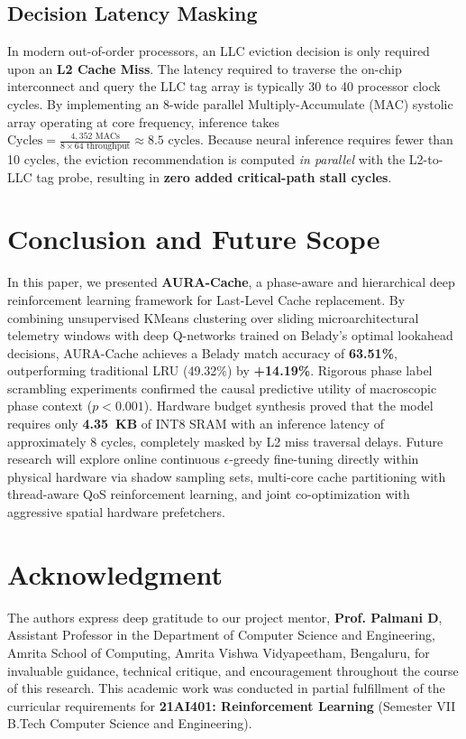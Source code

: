 \documentclass[conference]{IEEEtran}
\begin{document}
\subsection{Decision Latency Masking}
In modern out-of-order processors, an LLC eviction decision is only required upon an \textbf{L2 Cache Miss}. The latency required to traverse the on-chip interconnect and query the LLC tag array is typically 30 to 40 processor clock cycles. By implementing an 8-wide parallel Multiply-Accumulate (MAC) systolic array operating at core frequency, inference takes $\text{Cycles} = \frac{4,352 \text{ MACs}}{8 \times 64 \text{ throughput}} \approx 8.5 \text{ cycles}$. Because neural inference requires fewer than 10 cycles, the eviction recommendation is computed \textit{in parallel} with the L2-to-LLC tag probe, resulting in \textbf{zero added critical-path stall cycles}.

\section{Conclusion and Future Scope}
In this paper, we presented \textbf{AURA-Cache}, a phase-aware and hierarchical deep reinforcement learning framework for Last-Level Cache replacement. By combining unsupervised KMeans clustering over sliding microarchitectural telemetry windows with deep Q-networks trained on Belady's optimal lookahead decisions, AURA-Cache achieves a Belady match accuracy of \textbf{63.51\%}, outperforming traditional LRU (49.32\%) by \textbf{+14.19\%}. Rigorous phase label scrambling experiments confirmed the causal predictive utility of macroscopic phase context ($p < 0.001$). Hardware budget synthesis proved that the model requires only \textbf{4.35~KB} of INT8 SRAM with an inference latency of approximately 8 cycles, completely masked by L2 miss traversal delays. Future research will explore online continuous $\epsilon$-greedy fine-tuning directly within physical hardware via shadow sampling sets, multi-core cache partitioning with thread-aware QoS reinforcement learning, and joint co-optimization with aggressive spatial hardware prefetchers.

\section*{Acknowledgment}
The authors express deep gratitude to our project mentor, \textbf{Prof. Palmani D}, Assistant Professor in the Department of Computer Science and Engineering, Amrita School of Computing, Amrita Vishwa Vidyapeetham, Bengaluru, for invaluable guidance, technical critique, and encouragement throughout the course of this research. This academic work was conducted in partial fulfillment of the curricular requirements for \textbf{21AI401: Reinforcement Learning} (Semester VII B.Tech Computer Science and Engineering).
\end{document}
